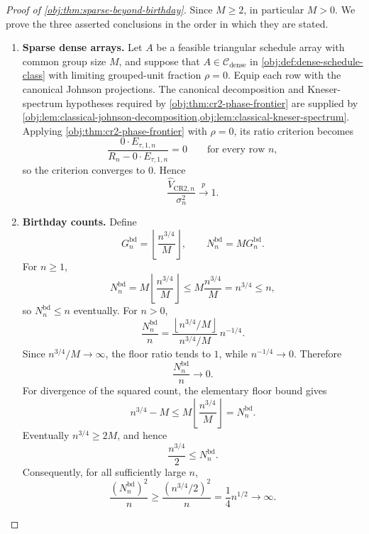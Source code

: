 \begin{proof}[Proof of \cref{obj:thm:sparse-beyond-birthday}]
Since \(M\ge 2\), in particular \(M>0\). We prove the three asserted conclusions in the order in which they are stated.
\begin{enumerate}
\item \textbf{Sparse dense arrays.}
Let \(A\) be a feasible triangular schedule array with common group size \(M\), and suppose that \(A\in\mathcal C_{\mathrm{dense}}\) in \cref{obj:def:dense-schedule-class} with limiting grouped-unit fraction \(\rho=0\). Equip each row with the canonical Johnson projections. The canonical decomposition and Kneser-spectrum hypotheses required by \cref{obj:thm:cr2-phase-frontier} are supplied by \cref{obj:lem:classical-johnson-decomposition,obj:lem:classical-kneser-spectrum}. Applying \cref{obj:thm:cr2-phase-frontier} with \(\rho=0\), its ratio criterion becomes
\[
\frac{0\cdot E_{\tau,1,n}}{R_n-0\cdot E_{\tau,1,n}}=0
\qquad\text{for every row }n,
\]
so the criterion converges to \(0\). Hence
\[
\frac{\widehat V_{\mathrm{CR2},n}}{\sigma_n^2}
\xrightarrow{p}1 .
\]

\item \textbf{Birthday counts.}
Define
\[
G_n^{\mathrm{bd}}
=
\left\lfloor \frac{n^{3/4}}{M}\right\rfloor,
\qquad
N_n^{\mathrm{bd}}=M G_n^{\mathrm{bd}} .
\]
For \(n\ge 1\),
\[
N_n^{\mathrm{bd}}
=
M\left\lfloor \frac{n^{3/4}}{M}\right\rfloor
\le
M\frac{n^{3/4}}{M}
=
n^{3/4}
\le n,
\]
so \(N_n^{\mathrm{bd}}\le n\) eventually. For \(n>0\),
\[
\frac{N_n^{\mathrm{bd}}}{n}
=
\frac{\left\lfloor n^{3/4}/M\right\rfloor}{n^{3/4}/M}\,
n^{-1/4}.
\]
Since \(n^{3/4}/M\to\infty\), the floor ratio tends to \(1\), while \(n^{-1/4}\to0\). Therefore
\[
\frac{N_n^{\mathrm{bd}}}{n}\to0.
\]
For divergence of the squared count, the elementary floor bound gives
\[
n^{3/4}-M
\le
M\left\lfloor \frac{n^{3/4}}{M}\right\rfloor
=
N_n^{\mathrm{bd}} .
\]
Eventually \(n^{3/4}\ge 2M\), and hence
\[
\frac{n^{3/4}}{2}\le N_n^{\mathrm{bd}}.
\]
Consequently, for all sufficiently large \(n\),
\[
\frac{(N_n^{\mathrm{bd}})^2}{n}
\ge
\frac{(n^{3/4}/2)^2}{n}
=
\frac14 n^{1/2}
\to\infty .
\]


\end{enumerate}
\end{proof}
